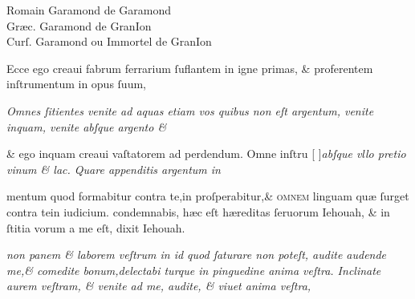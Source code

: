 \documentclass{article}
\newcommand{\threecolumntypefacenames}[3]{\begin{multicols}{3}
		\tiny
		\hfill \qquad \qquad \qquad \qquad #1\hspace*{\fill}\\
		\columnbreak
		\hfill #2\hspace*{\fill}\\
		\columnbreak
		\hfill #3\qquad \qquad \qquad \qquad \hspace*{\fill}
\end{multicols}}
\begin{document}
\vspace{-1.5\baselineskip}
\threecolumntypefacenames{Romain Garamond de Garamond}{Gr\ae{}c. Garamond de GranIon\quad\quad\quad\quad\quad\quad\quad\quad\quad\quad\quad}{Curſ. Garamond ou Immortel de GranIon}
\vspace{-3\baselineskip}
\begin{multicols}{2}
	\fontsize{6.25}{7}\selectfont
	\justifying
	\noindent \quad Ecce ego creaui fabrum ferrarium ſuflantem in igne primas, \& proferentem inſtrumentum in opus ſuum,\linebreak

	\columnbreak
	\justifying
	\noindent
	\textit{Omnes ſitientes venite ad aquas etiam vos quibus non eſt argentum, venite inquam, venite abſque argento \&\linebreak}
\end{multicols}
\fontsize{6.25}{7}\selectfont
\vspace{-2.7\baselineskip}
\noindent \& ego inquam creaui vaſtatorem ad perdendum. Omne inſtru \hfill[\hfill %
	{\grecs {}\selectfont{}}\hfill]\hfill \textit{abſque vllo pretio vinum \& lac. Quare appenditis argentum in}
\vspace{-1.6\baselineskip}
\begin{multicols}{2}
	\fontsize{6.25}{7}\selectfont
	\justifying
	\noindent mentum quod formabitur contra te,in proſperabitur,\& \textsc{ omnem} linguam qu\ae{} ſurget contra tein iudicium.\linebreak
	condemnabis, h\ae{}c eſt h\ae{}reditas ſeruorum Iehouah, \& in ſtitia vorum a me eſt, dixit Iehouah.

	\columnbreak
	\justifying
	\noindent
	\textit{non panem \& laborem veſtrum in id quod ſaturare non poteſt, audite audende me,\& comedite bonum,delectabi\linebreak
		turque in pinguedine anima veſtra. Inclinate aurem veſtram, \& venite ad me, audite, \& viuet anima veſtra,\linebreak
	}
\end{multicols}
\end{document}
